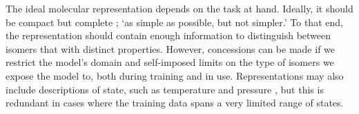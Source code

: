 The ideal molecular representation depends on the task at hand. Ideally, it should be compact but complete \cite{faberCrystalStructureRepresentations2015,himanenDScribeLibraryDescriptors2020}; `as simple as possible, but not simpler.' To that end, the representation should contain enough information to distinguish between isomers that with distinct properties. However, concessions can be made if we restrict the model's domain and self-imposed limits on the type of isomers we expose the model to, both during training and in use. Representations may also include descriptions of state, such as temperature and pressure \cite{chenGraphNetworksUniversal2019}, but this is redundant in cases where the training data spans a very limited range of states.





